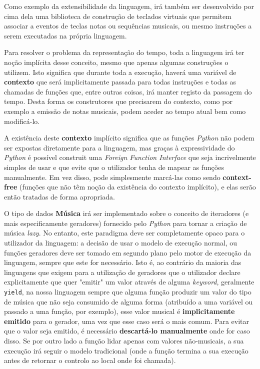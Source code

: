 Como exemplo da extensibilidade da linguagem, irá também ser desenvolvido por cima dela uma biblioteca de construção de teclados virtuais que permitem associar a eventos de teclas notas ou sequências musicais, ou mesmo instruções a serem executadas na própria linguagem.

Para resolver o problema da representação do tempo, toda a linguagem irá ter noção implícita desse conceito, mesmo que apenas algumas construções o utilizem. Isto significa que durante toda a execução, haverá uma variável de \textbf{contexto} que será implicitamente passada para todas instruções e todas as chamadas de funções que, entre outras coisas, irá manter registo da passagem do tempo. Desta forma os construtores que precisarem do contexto, como por exemplo a emissão de notas musicais, podem aceder ao tempo atual bem como modificá-lo.

A existência deste \textbf{contexto} implícito significa que as funções \textit{Python} não podem ser expostas diretamente para a linguagem, mas graças à expressividade do \textit{Python} é possível construit uma \textit{Foreign Function Interface} que seja incrivelmente simples de usar e que evite que o utilizador tenha de mapear as funções manualmente. Em vez disso, pode simplesmente marcá-las como sendo \textbf{context-free} (funções que não têm noção da existência do contexto implícito), e elas serão então tratadas de forma apropriada.

O tipo de dados \textbf{Música} irá ser implementado sobre o conceito de iteradores (e mais especificamente geradores) fornecido pelo \textit{Python} para tornar a criação de música \textit{lazy}. No entanto, este paradigma deve ser completamente opaco para o utilizador da linguagem: a decisão de usar o modelo de execução normal, ou funções geradores deve ser tomado em segundo plano pelo motor de execução da linguagem, sempre que este for necessário. Isto é, ao contrário da maioria das linguagens que exigem para a utilização de geradores que o utilizador declare explicitamente que quer "emitir" um valor através de alguma \textit{keyword}, geralmente \texttt{yield}, na nossa linguagem sempre que alguma função produzir um valor do tipo de música que não seja consumido de alguma forma (atribuído a uma variável ou passado a uma função, por exemplo), esse valor musical é \textbf{implicitamente emitido} para o gerador, uma vez que esse caso será o mais comum. Para evitar que o valor seja emitido, é necessário \textbf{descartá-lo manualmente} onde for caso disso. Se por outro lado a função lidar apenas com valores não-musicais, a sua execução irá seguir o modelo tradicional (onde a função termina a sua execução antes de retornar o controlo ao local onde foi chamada).
\newpage
